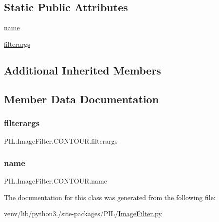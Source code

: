 \subsection*{Static Public Attributes}
\begin{DoxyCompactItemize}
\item 
\hyperlink{classPIL_1_1ImageFilter_1_1CONTOUR_ad5e9fef618da0cf71cd62b0d924cebe2}{name}
\item 
\hyperlink{classPIL_1_1ImageFilter_1_1CONTOUR_a5700ee4f59ee31e0008b7eaa9e84b33b}{filterargs}
\end{DoxyCompactItemize}
\subsection*{Additional Inherited Members}


\subsection{Member Data Documentation}
\mbox{\label{classPIL_1_1ImageFilter_1_1CONTOUR_a5700ee4f59ee31e0008b7eaa9e84b33b}} 
\subsubsection{\texorpdfstring{filterargs}{filterargs}}
{\footnotesize\ttfamily P\+I\+L.\+Image\+Filter.\+C\+O\+N\+T\+O\+U\+R.\+filterargs\hspace{0.3cm}{\ttfamily [static]}}

\mbox{\label{classPIL_1_1ImageFilter_1_1CONTOUR_ad5e9fef618da0cf71cd62b0d924cebe2}} 
\subsubsection{\texorpdfstring{name}{name}}
{\footnotesize\ttfamily P\+I\+L.\+Image\+Filter.\+C\+O\+N\+T\+O\+U\+R.\+name\hspace{0.3cm}{\ttfamily [static]}}



The documentation for this class was generated from the following file\+:\begin{DoxyCompactItemize}
\item 
venv/lib/python3./site-\/packages/\+P\+I\+L/\hyperlink{ImageFilter_8py}{Image\+Filter.\+py}\end{DoxyCompactItemize}
